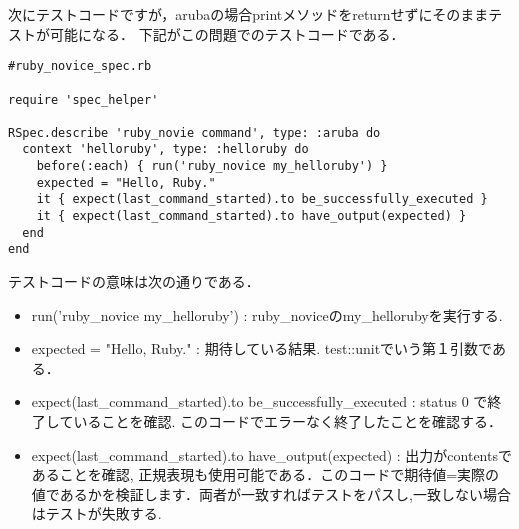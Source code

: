 次にテストコードですが，arubaの場合printメソッドをreturnせずにそのままテストが可能になる．
下記がこの問題でのテストコードである．
\begin{lstlisting}[style=customRuby,basicstyle={\scriptsize\ttfamily}]
#ruby_novice_spec.rb

require 'spec_helper'

RSpec.describe 'ruby_novie command', type: :aruba do 
  context 'helloruby', type: :helloruby do
    before(:each) { run('ruby_novice my_helloruby') }
    expected = "Hello, Ruby."
    it { expect(last_command_started).to be_successfully_executed }
    it { expect(last_command_started).to have_output(expected) }
  end
end
\end{lstlisting}
テストコードの意味は次の通りである．
\begin{itemize}
\item run('ruby\_novice my\_helloruby') : ruby\_noviceのmy\_hellorubyを実行する.

\item expected = "Hello, Ruby." : 期待している結果. test::unitでいう第１引数である．

\item expect(last\_command\_started).to be\_successfully\_executed : status 0 で終了していることを確認. このコードでエラーなく終了したことを確認する．

\item expect(last\_command\_started).to have\_output(expected) : 出力がcontentsであることを確認, 正規表現も使用可能である．このコードで期待値=実際の値であるかを検証します．両者が一致すればテストをパスし,一致しない場合はテストが失敗する.

\end{itemize}
